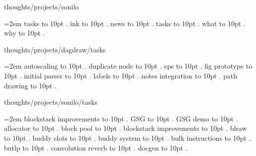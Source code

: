 \smallskip
\par\endgroup
\bigskip
{}
thoughts/projects/sonilo
\par\begingroup
\leftskip=2em
\smallskip
tasks \leaders\hbox to 10pt {\hss.\hss}  \hfill {}
\smallskip
\medskip
ink \leaders\hbox to 10pt {\hss.\hss}  \hfill {}
\smallskip
news \leaders\hbox to 10pt {\hss.\hss}  \hfill {}
\smallskip
tasks \leaders\hbox to 10pt {\hss.\hss}  \hfill {}
\smallskip
what \leaders\hbox to 10pt {\hss.\hss}  \hfill {}
\smallskip
why \leaders\hbox to 10pt {\hss.\hss}  \hfill {}
\smallskip
\par\endgroup
\bigskip
{}
thoughts/projects/dagdraw/tasks
\par\begingroup
\leftskip=2em
\smallskip
\medskip
autoscaling \leaders\hbox to 10pt {\hss.\hss}  \hfill {}
\smallskip
duplicate node \leaders\hbox to 10pt {\hss.\hss}  \hfill {}
\smallskip
eps \leaders\hbox to 10pt {\hss.\hss}  \hfill {}
\smallskip
fig prototype \leaders\hbox to 10pt {\hss.\hss}  \hfill {}
\smallskip
initial parser \leaders\hbox to 10pt {\hss.\hss}  \hfill {}
\smallskip
labels \leaders\hbox to 10pt {\hss.\hss}  \hfill {}
\smallskip
notes integration \leaders\hbox to 10pt {\hss.\hss}  \hfill {}
\smallskip
path drawing \leaders\hbox to 10pt {\hss.\hss}  \hfill {}
\smallskip
\par\endgroup
\bigskip
{}
thoughts/projects/sonilo/tasks
\par\begingroup
\leftskip=2em
\smallskip
blockstack improvements \leaders\hbox to 10pt {\hss.\hss}  \hfill {}
\smallskip
\medskip
GSG \leaders\hbox to 10pt {\hss.\hss}  \hfill {}
\smallskip
GSG demo \leaders\hbox to 10pt {\hss.\hss}  \hfill {}
\smallskip
allocator \leaders\hbox to 10pt {\hss.\hss}  \hfill {}
\smallskip
block pool \leaders\hbox to 10pt {\hss.\hss}  \hfill {}
\smallskip
blockstack improvements \leaders\hbox to 10pt {\hss.\hss}  \hfill {}
\smallskip
blsaw \leaders\hbox to 10pt {\hss.\hss}  \hfill {}
\smallskip
buddy slots \leaders\hbox to 10pt {\hss.\hss}  \hfill {}
\smallskip
buddy system \leaders\hbox to 10pt {\hss.\hss}  \hfill {}
\smallskip
bulk instructions \leaders\hbox to 10pt {\hss.\hss}  \hfill {}
\smallskip
butlp \leaders\hbox to 10pt {\hss.\hss}  \hfill {}
\smallskip
convolution reverb \leaders\hbox to 10pt {\hss.\hss}  \hfill {}
\smallskip
docgen \leaders\hbox to 10pt {\hss.\hss}  \hfill {}
